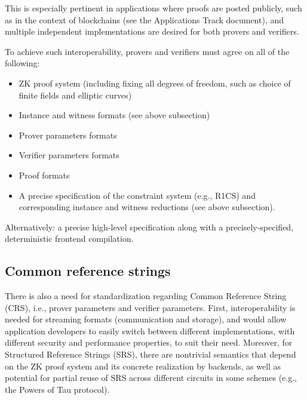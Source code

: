 This is especially pertinent in applications where proofs are posted publicly, such as in the context of blockchains (see the Applications Track document), and multiple independent implementations are desired for both provers and verifiers.

To achieve such interoperability, provers and verifiers must agree on all of the following: %
\begin{itemize}
    \item ZK proof system (including fixing all degrees of freedom, such as choice of finite fields and elliptic curves)
    \item Instance and witness formats (see above subsection)
    \item Prover parameters formats
    \item Verifier parameters formats
    \item Proof formats
    \item A precise specification of the constraint system (e.g., R1CS) and corresponding instance and witness reductions (see above subsection).
\end{itemize}

Alternatively: a precise high-level specification along with a precisely-specified, deterministic frontend compilation.


\subsection{Common reference strings}
There is also a need for standardization regarding Common Reference String (CRS), i.e., prover parameters and verifier parameters. 
First, interoperability is needed for streaming formats (communication and storage), and would allow application developers to easily switch between different implementations, with different security and performance properties, to suit their need.
Moreover, for Structured Reference Strings (SRS), there are nontrivial semantics that depend on the ZK proof system and its concrete realization by backends, as well as potential for partial reuse of SRS across different circuits in some schemes (e.g., the Powers of Tau protocol). 

